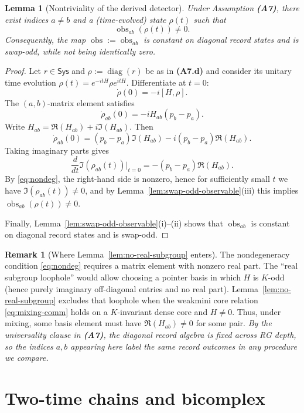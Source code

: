 \documentclass[aps,prl,reprint]{revtex4-2}
\newcommand{\Sys}{\mathsf{Sys}}
\newcommand{\diag}{\operatorname{diag}}
\newcommand{\obs}{\operatorname{obs}}
\theoremstyle{definition}
\newtheorem{remark}{Remark}[section]
\theoremstyle{plain}
\newtheorem{lemma}{Lemma}[section]
\begin{document}
\begin{lemma}[Nontriviality of the derived detector]
\label{lem:derived-detector-nontrivial}
Under Assumption \textbf{(A7)}, there exist indices $a\ne b$ and a (time-evolved)
state $\rho(t)$ such that
\[\obs_{ab}(\rho(t))\ne 0.\]
Consequently, the map $\obs:=\obs_{ab}$ is constant on diagonal record states and is
swap-odd, while not being identically zero.

\end{lemma}

\begin{proof}
Let $r\in\Sys$ and $\rho:=\diag(r)$ be as in \textbf{(A7.d)} and consider its
unitary time evolution $\rho(t)=e^{-itH}\rho e^{itH}$.
Differentiate at $t=0$:
\[\dot\rho(0)=-i[H,\rho].\]
The $(a,b)$-matrix element satisfies
\[\dot\rho_{ab}(0)=-iH_{ab}(p_b-p_a).\]
Write $H_{ab}=\Re(H_{ab})+i\Im(H_{ab})$. Then
\[\dot\rho_{ab}(0)=(p_b-p_a)\Im(H_{ab}) - i(p_b-p_a)\Re(H_{ab}).\]
Taking imaginary parts gives
\[\frac{d}{dt}\Im(\rho_{ab}(t))\Big\rvert_{t=0}=-(p_b-p_a)\Re(H_{ab}).\]
By \eqref{eq:nondeg}, the right-hand side is nonzero, hence for sufficiently small
$t$ we have $\Im(\rho_{ab}(t))\ne 0$, and by Lemma~\ref{lem:swap-odd-observable}(iii)
this implies $\obs_{ab}(\rho(t))\ne 0$.

Finally, Lemma~\ref{lem:swap-odd-observable}(i)--(ii) shows that $\obs_{ab}$ is
constant on diagonal record states and is swap-odd.
\end{proof}

\begin{remark}[Where Lemma~\ref{lem:no-real-subgroup} enters]
The nondegeneracy condition \eqref{eq:nondeg} requires a matrix element with nonzero
real part. The ``real subgroup loophole'' would allow choosing a pointer basis in
which $H$ is $K$-odd (hence purely imaginary off-diagonal entries and no real part).
Lemma~\ref{lem:no-real-subgroup} excludes that loophole when the weakmini core
relation \eqref{eq:mixing-comm} holds on a $K$-invariant dense core and $H\ne 0$.
Thus, under mixing, some basis element must have $\Re(H_{ab})\ne 0$ for some pair.
\emph{By the universality clause in \textbf{(A7)}, the diagonal record algebra is fixed across RG depth, so the indices $a,b$ appearing here label the same record outcomes in any procedure we compare.}
\end{remark}

\section{Two-time chains and bicomplex}
\label{sec:bicomplex}
\end{document}
